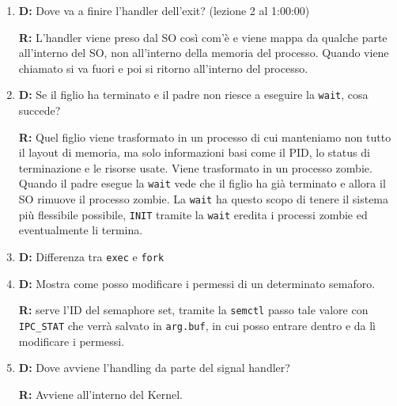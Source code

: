\documentclass[a4paper, 12pt]{book}
\begin{document}
    \begin{enumerate}
        \item \textbf{D:} Dove va a finire l'handler dell'exit? (lezione 2 al 1:00:00)
        
        \textbf{R:} L'handler viene preso dal SO così com'è e viene 
        mappa da qualche parte all'interno del SO, non 
        all'interno della memoria del processo. Quando viene 
        chiamato si va fuori e poi si ritorno all'interno 
        del processo.
        \item \textbf{D:} Se il figlio ha terminato e il padre non riesce a 
        eseguire la \verb|wait|, cosa succede?

        \textbf{R:} Quel figlio viene trasformato in un processo di cui manteniamo 
        non tutto il layout di memoria, ma solo informazioni basi come il PID, lo status
        di terminazione e le risorse usate. Viene trasformato in un processo zombie. Quando il padre 
        esegue la \verb|wait| vede che il figlio ha già terminato e allora il SO 
        rimuove il processo zombie. La \verb|wait| ha questo scopo di tenere il sistema 
        più flessibile possibile, \verb|INIT| tramite la \verb|wait| eredita i processi 
        zombie ed eventualmente li termina.
        \item \textbf{D:} Differenza tra \verb|exec| e \verb|fork|
        \item \textbf{D:} Mostra come posso modificare i permessi 
        di un determinato semaforo. 

        \textbf{R:} serve l'ID del semaphore set, tramite la \verb|semctl| 
        passo tale valore con \verb|IPC_STAT| che  verrà salvato 
        in \verb|arg.buf|, in cui posso entrare dentro e 
        da lì modificare i permessi.
        \item \textbf{D:} Dove avviene l'handling da parte del signal handler?
        
        \textbf{R:} Avviene all'interno del Kernel.
    \end{enumerate}

    









     


    
    
\end{document}
